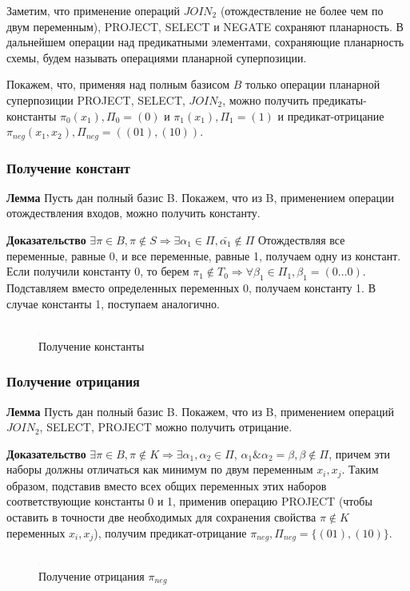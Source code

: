 \documentclass[12pt]{article}
\begin{document}
Заметим, что применение операций $JOIN_2$ (отождествление не более чем по двум переменным), PROJECT, SELECT и NEGATE 
сохраняют планарность. В дальнейшем операции над предикатными элементами, сохраняющие планарность схемы,
будем называть операциями планарной суперпозиции.

Покажем, что, применяя над полным базисом $B$ только операции планарной суперпозиции PROJECT, SELECT, $JOIN_2$,
можно получить предикаты-константы
$\pi_0(x_1), \Pi_0=(0)$ и $\pi_1(x_1), \Pi_1=(1)$ и предикат-отрицание $\pi_{neg}(x_1, x_2), \Pi_{neg}=( (01), (10) )$.

\subsubsection{Получение констант}
\textbf{Лемма} Пусть дан полный базис B. Покажем, что из B, применением операции отождествления входов,
можно получить константу.

\textbf{Доказательство} $\exists \pi \in B, \pi \notin S \Rightarrow \exists \alpha_1 \in \Pi, \bar{\alpha_1} \notin \Pi$
Отождествляя все переменные, равные 0, и все переменные, равные 1, получаем одну из констант.
Если получили константу 0, то берем $\pi_1 \notin T_0 \Rightarrow \forall \beta_1 \in \Pi_1, \beta_1=(0 \ldots 0)$. 
Подставляем вместо определенных переменных 0, получаем константу 1. 
В случае константы 1, поступаем аналогично.
\begin{figure}[htb]
\centering
\includegraphics[width=0.01\textwidth]{3_2to3.png}
\caption{Получение константы}
\label{fig:constant}
\end{figure}

\subsubsection{Получение отрицания}
\textbf{Лемма}
Пусть дан полный базис B. Покажем, что из B, применением операций $JOIN_2$, SELECT, PROJECT можно получить отрицание.

\textbf{Доказательство} $\exists \pi \in B, \pi \notin K \Rightarrow \exists \alpha_1, \alpha_2 \in \Pi$,
$\alpha_1\&\alpha_2=\beta, \beta \notin \Pi$, причем эти наборы должны отличаться как минимум по двум переменным $x_i, x_{j}$.
Таким образом, подставив вместо всех общих переменных этих наборов соответствующие константы 0 и 1, применив операцию PROJECT
(чтобы оставить в точности две необходимых для сохранения свойства $\pi \notin K$ переменных $x_i, x_j$), 
получим предикат-отрицание $\pi_{neg}, \Pi_{neg} = \{ (01), (10) \} $.
\begin{figure}[htb]
\centering
\includegraphics[width=0.01\textwidth]{3_2to3.png}
\caption{Получение отрицания $\pi_{neg}$}
\label{fig:negation}
\end{figure}
\end{document}
